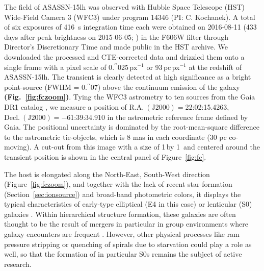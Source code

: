 \documentclass[traditabstract]{aa}
\newcommand{\farc}{\hbox{$.\!\!^{\prime\prime}$}}
\begin{document}
The field of ASASSN-15lh was observed with Hubble Space Telescope (HST) Wide-Field Camera 3 (WFC3) under program 14346 (PI: C. Kochanek). A total of six exposures of 416~s integration time each were obtained on 2016-08-11 (433 days after peak brightness on 2015-06-05; \citealt{2016Sci...351..257D}) in the F606W filter through Director's Discretionary Time and made public in the HST archive. We downloaded the processed and CTE-corrected data and drizzled them onto a single frame with a pixel scale of 0\farc{025}\,$\mathrm{px}^{-1}$ or 93\,pc\,px$^{-1}$ at the redshift of ASASSN-15lh. The transient is clearly detected at high significance as a bright point-source (FWHM = 0\farc{07}) above the continuum emission of the galaxy \textbf{(Fig.~\ref{fig:fczoom})}. Tying the WFC3 astrometry to ten sources from the Gaia DR1 catalog \citep{2016A&A...595A...2G, 2016A&A...595A...1G}, we measure a position of $\mathrm{R.A.~(J2000)}=$22:02:15.4263, $\mathrm{Decl.~(J2000)} = -$61:39:34.910 in the astrometric reference frame defined by Gaia. The positional uncertainty is dominated by the root-mean-square difference to the astrometric tie-objects, which is 8 mas in each coordinate (30 pc co-moving). A cut-out from this image with a size of 1\arcmin\,by 1\arcmin~and centered around the transient position is shown in the central panel of Figure~\ref{fig:fc}.

The host is elongated along the North-East, South-West direction (Figure~\ref{fig:fczoom}), and together with the lack of recent star-formation (Section~\ref{sec:ionsource}) and broad-band photometric colors, it displays the typical characteristics of early-type elliptical (E4 in this case) or lenticular (S0) galaxies \citep[e.g.,][]{2009ARA&A..47..159B}. Within hierarchical structure formation, these galaxies are often thought to be the result of mergers in particular in group environments where galaxy encounters are frequent \citep[e.g.,][]{2005A&A...437...69B, 2011MNRAS.415.1783B}. However, other physical processes like ram pressure stripping or quenching of spirals due to starvation could play a role as well, so that the formation of in particular S0s remains the subject of active research.
\end{document}
